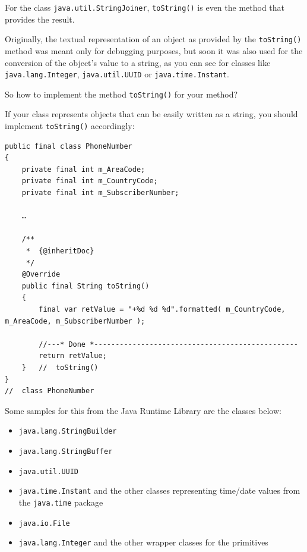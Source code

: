 \documentclass[11pt,a4paper, titlepage, parskip=half, headsepline, footsepline, cleardoublepage=current, headheight=1cm]{scrbook}
\begin{document}
For the class \lstinline|java.util.StringJoiner|\autocite{ORACLE_DOC_STRINGJOINER_CLASS}, \lstinline|toString()| is even the method that provides the result.

Originally, the textual representation of an object as provided by the \lstinline|toString()| method was meant only for debugging purposes, but soon it was also used for the conversion of the object's value to a string, as you can see for classes like \lstinline|java.lang.Integer|, \lstinline|java.util.UUID| or \lstinline|java.time.Instant|.

So how to implement the method \lstinline|toString()| for your method?

If your class represents objects that can be easily written as a string, you should implement \lstinline|toString()| accordingly:
\begin{lstlisting}
public final class PhoneNumber
{
    private final int m_AreaCode;
    private final int m_CountryCode;
    private final int m_SubscriberNumber;
    
    …
    
    /**
     *  {@inheritDoc}
     */
    @Override 
    public final String toString()
    {
        final var retValue = "+%d %d %d".formatted( m_CountryCode, m_AreaCode, m_SubscriberNumber );
        
        //---* Done *------------------------------------------------
        return retValue;
    }   //  toString()
}   
//  class PhoneNumber
\end{lstlisting}

Some samples for this from the Java Runtime Library are the classes below:
\begin{itemize}
\item\lstinline|java.lang.StringBuilder|\autocite{ORACLE_DOC_STRINGBUILDER_CLASS}
\item\lstinline|java.lang.StringBuffer|\autocite{ORACLE_DOC_STRINGBUFFER_CLASS}
\item\lstinline|java.util.UUID|\autocite{ORACLE_DOC_UUID_CLASS}
\item\lstinline|java.time.Instant|\autocite{ORACLE_DOC_INSTANT_CLASS} and the other classes representing time/date values from the \lstinline|java.time| package\autocite{ORACLE_DOC_TIME_PACKAGE}
\item\lstinline|java.io.File|\autocite{ORACLE_DOC_FILE_CLASS}
\item\lstinline|java.lang.Integer|\autocite{ORACLE_DOC_INTEGER_CLASS} and the other wrapper classes for the primitives
\end{itemize}
\end{document}
